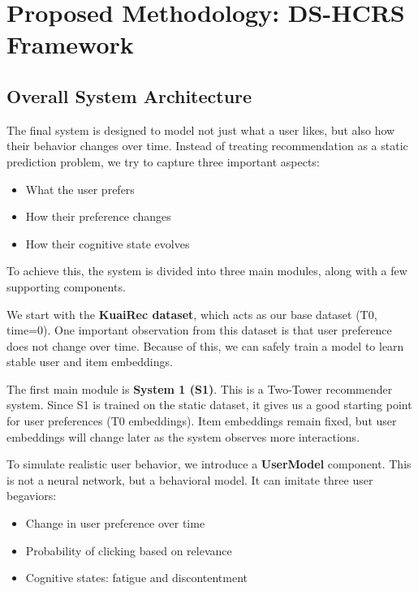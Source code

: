 \section{Proposed Methodology: DS-HCRS Framework}



\subsection{Overall System Architecture}

The final system is designed to model not just what a user likes, 
but also how their behavior changes over time.
Instead of treating recommendation as a static prediction problem, 
we try to capture three important aspects:

\begin{itemize}
    \item What the user prefers
    \item How their preference changes
    \item How their cognitive state evolves
\end{itemize}

To achieve this, the system is divided into three main modules, along with a few supporting components.

We start with the \textbf{KuaiRec dataset}, which acts as our base dataset (T0, time=0). 
One important observation from this dataset is that user preference does not change over time. 
Because of this, we can safely train a model to learn stable user and item embeddings.

The first main module is \textbf{System 1 (S1)}. This is a Two-Tower recommender system. 
Since S1 is trained on the static dataset, it gives us a good starting point for user preferences (T0 embeddings).
Item embeddings remain fixed, but user embeddings will change later as the system observes more interactions.

To simulate realistic user behavior, we introduce a \textbf{UserModel} component. 
This is not a neural network, but a behavioral model. 
It can imitate three user begaviors:

\begin{itemize}
    \item Change in user preference over time
    \item Probability of clicking based on relevance
    \item Cognitive states: fatigue and discontentment
\end{itemize}

